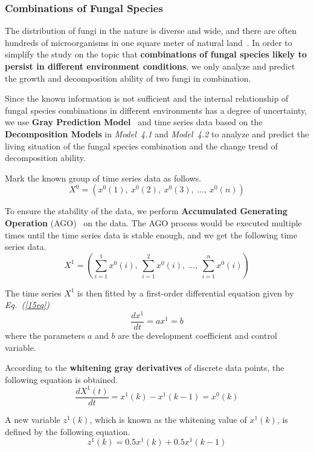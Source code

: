 \subsubsection{Combinations of Fungal Species}
The distribution of fungi in the nature is diverse and wide, and there are often hundreds of microorganisms in one square meter of natural land~\cite{land}. In order to simplify the study on the topic that \textbf{combinations of fungal species likely to persist in different environment conditions}, we only analyze and predict the growth and decomposition ability of two fungi in combination.
\par
Since the known information is not sufficient and the internal relationship of fungal species combinations in different environments has a degree of uncertainty, we use \textbf{Gray Prediction Model}~\cite{gray} and time series data based on the \textbf{Decomposition Models} in \textit{Model~4.1} and \textit{Model~4.2} to analyze and predict the living situation of the fungal species combination and the change trend of decomposition ability.
\par
Mark the known group of time series data as follows.
$$X^0 = (x^0(1),\ x^0(2),\ x^0(3),\ \ldots,\ x^0(n))$$
\par
To ensure the stability of the data, we perform \textbf{Accumulated Generating Operation} (AGO)~\cite{gray} on the data. The AGO process would be executed multiple times until the time series data is stable enough, and we get the following time series data.
$$X^1 = (\sum^1_{i=1}x^0(i),\ \sum^2_{i=1}x^0(i),\ \ldots,\ \sum^n_{i=1}x^0(i))$$
\par
The time series $X^1$ is then fitted by a first-order differential equation given by \textit{Eq.~(\ref{15eq})}
\begin{equation}
  \label{15eq}
  \frac{dx^1}{dt} = ax^1 = b
\end{equation}
where the parameters $a$ and $b$ are the development coefficient and control variable.
\par
According to the \textbf{whitening gray derivatives} of discrete data points, the following equation is obtained.
\begin{equation}
  \frac{dX^1(t)}{dt} = x^1(k) - x^1(k-1) = x^0(k)
\end{equation}
\par
A new variable $z^1(k)$, which is known as the whitening value of $x^1(k)$, is defined by the following equation.
\begin{equation}
  z^1(k) = 0.5x^1(k) + 0.5x^1(k-1)
\end{equation}
